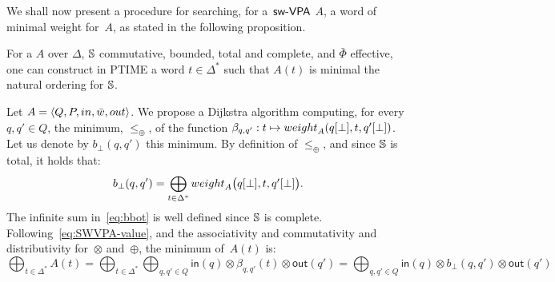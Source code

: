 \label{sec:best}\label{sec:search}
\noindent
We shall now present a procedure for searching, for a~$\textsf{sw-VPA}$ $A$,
a word %
of minimal weight for~$A$,
as stated in the following proposition. %
%
\begin{proposition}\label{th:best-search}
For a \SWVPA $A$
over $\Delta$,
$\mathbb{S}$ commutative, bounded, total and complete, %
and $\bar\Phi$ effective, %
one can construct in PTIME a word $t \in \Delta^*$
such that $A(t)$ is minimal \wrt the natural ordering for $\mathbb{S}$.
\end{proposition}
%
Let $A = \< Q, P, \init, \bar\wei, \final >$.
%
We propose a Dijkstra algorithm computing,
for every $q, q' \in Q$,
the minimum, \wrt $\leq_\oplus$, of the function
$\beta_{q, q'} : t \mapsto \weight_A(\config{q}{\bot}, t, \config{q'}{\bot})$.
Let us denote by $b_\bot(q, q')$ this minimum.
By definition of $\leq_\oplus$, and since $\mathbb{S}$ is total,
it holds that:
%
\begin{equation}\label{eq:bbot}
  b_\bot(q, q') = \bigoplus_{t\in \Delta^*}
  \textstyle
  \weight_A\bigl(\config{q}{\bot}, t, \config{q'}{\bot}\bigr).
\end{equation}
The infinite sum in~\eqref{eq:bbot} is well defined since $\mathbb{S}$ is complete.
%
Following~\eqref{eq:SWVPA-value}, and the associativity and commutativity
and distributivity for~$\otimes$ and~$\oplus$, the minimum of~$A(t)$ is:
\begin{equation}\label{eq:min}
{\displaystyle\bigoplus_{t\in \Delta^*}} A(t)
= 
{\displaystyle\bigoplus_{t\in \Delta^*}}
{\displaystyle\bigoplus_{q, q' \in Q}} \textstyle
\mathsf{in}(q) \mathop{\otimes}
\beta_{q, q'}(t)
\mathop{\otimes} \mathsf{out}(q')
=
{\displaystyle\bigoplus_{q, q' \in Q}} \textstyle
\mathsf{in}(q) \mathop{\otimes}
b_\bot(q, q')
\mathop{\otimes} \mathsf{out}(q')
\end{equation}

